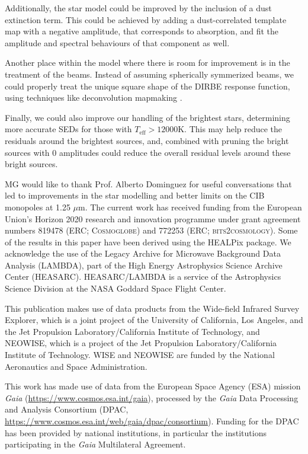 \documentclass{aa}
\begin{document}
Additionally, the star model could be improved by the inclusion of a dust extinction term. This could be achieved by adding a dust-correlated template map with a negative amplitude, that corresponds to absorption, and fit the amplitude and spectral behaviours of that component as well.

Another place within the model where there is room for improvement is in the treatment of the beams. Instead of assuming spherically symmerized beams, we could properly treat the unique square shape of the DIRBE response function, using techniques like deconvolution mapmaking \citep{artdeco}.

Finally, we could also improve our handling of the brightest stars, determining more accurate SEDs for those with $T_{\mathrm{eff}}>12000$K. This may help reduce the residuals around the brightest sources, and, combined with pruning the bright sources with 0 amplitudes could reduce the overall residual levels around these bright sources.


\begin{acknowledgements}
MG would like to thank Prof. Alberto Dominguez for useful conversations that led to improvements in the star modelling and better limits on the CIB monopoles at 1.25 $\mu$m.
 The current work has received funding from the European
  Union’s Horizon 2020 research and innovation programme under grant
  agreement numbers 819478 (ERC; \textsc{Cosmoglobe}) and 772253 (ERC;
  \textsc{bits2cosmology}). Some of the results in this paper have been derived using the HEALPix \citep{healpix} package.
  We acknowledge the use of the Legacy Archive for Microwave Background Data
  Analysis (LAMBDA), part of the High Energy Astrophysics Science Archive Center
  (HEASARC). HEASARC/LAMBDA is a service of the Astrophysics Science Division at
  the NASA Goddard Space Flight Center.  
  
   This publication makes use of data products from the Wide-field Infrared Survey Explorer, which is a joint project of the University of California, Los Angeles, and the Jet Propulsion Laboratory/California Institute of Technology, and NEOWISE, which is a project of the Jet Propulsion Laboratory/California Institute of Technology. WISE and NEOWISE are funded by the National Aeronautics and Space Administration.
   
   This work has made use of data from the European Space Agency (ESA) mission
{\it Gaia} (\url{https://www.cosmos.esa.int/gaia}), processed by the {\it Gaia}
Data Processing and Analysis Consortium (DPAC,
\url{https://www.cosmos.esa.int/web/gaia/dpac/consortium}). Funding for the DPAC
has been provided by national institutions, in particular the institutions
participating in the {\it Gaia} Multilateral Agreement.
\end{acknowledgements}


%



\end{document}
